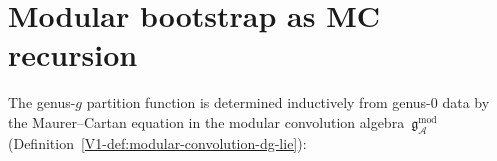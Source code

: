 %

\providecommand{\cA}{\mathcal{A}}
\providecommand{\cH}{\mathcal{H}}
\providecommand{\cM}{\mathcal{M}}
\providecommand{\cC}{\mathcal{C}}
\providecommand{\fg}{\mathfrak{g}}
\providecommand{\fC}{\mathfrak{C}}
\providecommand{\gAmod}{\mathfrak{g}_{\cA}^{\mathrm{mod}}}
\providecommand{\dzero}{d_0}
\providecommand{\dfib}{d_{\mathrm{fib}}}
\providecommand{\MC}{\text{MC}}
\providecommand{\barB}{\overline{B}}
\providecommand{\Defcyc}{\operatorname{Def}_{\mathrm{cyc}}}
\providecommand{\Definfmod}{\operatorname{Def}_{\infty}^{\mathrm{mod}}}
\providecommand{\Convstr}{\operatorname{Conv}_{\mathrm{str}}}
\providecommand{\Convinf}{\operatorname{Conv}_{\infty}}
\providecommand{\Gmod}{\mathcal{G}^{\mathrm{mod}}}
\providecommand{\Tr}{\operatorname{Tr}}
\providecommand{\Hom}{\operatorname{Hom}}
\providecommand{\Res}{\operatorname{Res}}
\providecommand{\id}{\mathrm{id}}
\providecommand{\ad}{\operatorname{ad}}
\providecommand{\gr}{\operatorname{gr}}
\providecommand{\wt}{\operatorname{wt}}
\providecommand{\Aut}{\operatorname{Aut}}
\providecommand{\Det}{\operatorname{Det}}
\providecommand{\Sym}{\operatorname{Sym}}
\providecommand{\Omegach}{\Omega^{\text{ch}}}

\providecommand{\Ob}{\mathrm{Ob}}
\providecommand{\Shad}{\operatorname{Sh}}
\providecommand{\hCont}{\mathsf{h}}
\providecommand{\BVop}{\Delta_{\mathrm{BV}}}
\providecommand{\dsew}{d_{\mathrm{sew}}}
\providecommand{\dpf}{d_{\mathrm{pf}}}

\section{Modular bootstrap as MC recursion}

The genus-$g$ partition function is determined inductively from
genus-$0$ data by the Maurer--Cartan equation in the modular
convolution algebra~$\gAmod$
(Definition~\ref*{V1-def:modular-convolution-dg-lie}):


